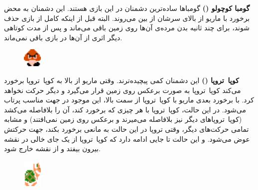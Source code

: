 \documentclass{utap}
\begin{document}
	\begin{itemize}
	
		\begin{minipage}{.75\textwidth}
		\item

\textbf{گومبا کوچولو ()}
گومباها ساده‌ترین دشمنان در این بازی هستند. این دشمنان به محض برخورد با ماریو از بالای سرشان از بین می‌روند. البته قبل از اینکه کامل از بازی حذف شوند، برای چند ثانیه بدن مرده‌ی آن‌ها روی زمین باقی می‌ماند و پس از مدت کوتاهی دیگر اثری از آن‌ها در بازی باقی نمی‌ماند.
\end{minipage}
\begin{minipage}{.15\textwidth}
\begin{figure}[H]
	\begin{center}
		\includegraphics[width=0.9cm]{goomba}
	\end{center}
\end{figure}
\end{minipage}


		\begin{minipage}{.75\textwidth}
		\item
\textbf{کوپا~تروپا ()}
این دشمنان کمی پیچیده‌ترند. وقتی ماریو از بالا به کوپا~تروپا برخورد می‌کند کوپا~تروپا به صورت برعکس روی زمین قرار می‌گیرد و دیگر حرکت نخواهد کرد. با برخورد بعدی ماریو با کوپا~تروپا از سمت بالا، این موجود در جهت مناسب پرتاب می‌شود. در این حالت، کوپا~تروپا با هر چیزی که برخورد کند، آن را بلافاصله می‌کشد (کوپا~تروپاهای دیگر نیز بلافاصله می‌میرند و برعکس روی زمین نمی‌افتند) و مشابه تمامی حرکت‌های دیگر، وقتی تروپا در این حالت به مانعی برخورد بکند، جهت حرکتش عوض می‌شود. و این حالت تا جایی ادامه دارد که کوپا~تروپا از یک جای خالی در نقشه بیرون بیفتد و از نقشه خارج شود.
\end{minipage}
\begin{minipage}{.15\textwidth}
\begin{figure}[H]
	\begin{center}
		\includegraphics[width=0.9cm]{koopa}
	\end{center}
\end{figure}
\end{minipage}

	\end{itemize}
\end{document}
